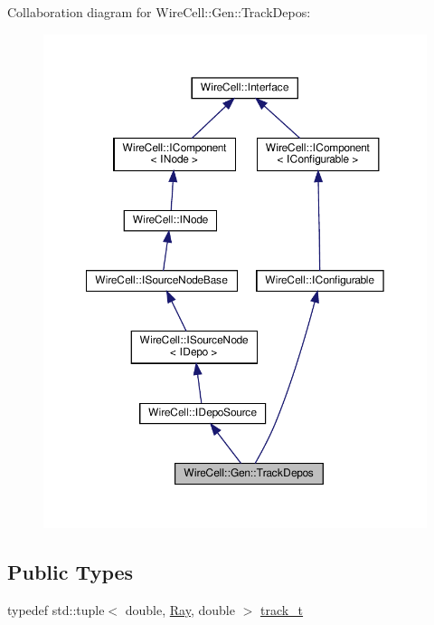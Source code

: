 Collaboration diagram for Wire\+Cell\+:\+:Gen\+:\+:Track\+Depos\+:
\nopagebreak
\begin{figure}[H]
\begin{center}
\leavevmode
\includegraphics[width=350pt]{class_wire_cell_1_1_gen_1_1_track_depos__coll__graph}
\end{center}
\end{figure}
\subsection*{Public Types}
\begin{DoxyCompactItemize}
\item 
typedef std\+::tuple$<$ double, \hyperlink{namespace_wire_cell_a3ab20d9b438feb7eb1ffaab9ba98af0c}{Ray}, double $>$ \hyperlink{class_wire_cell_1_1_gen_1_1_track_depos_a70b397dea6bfcd6d4181a1716b0f3e54}{track\+\_\+t}
\end{DoxyCompactItemize}
